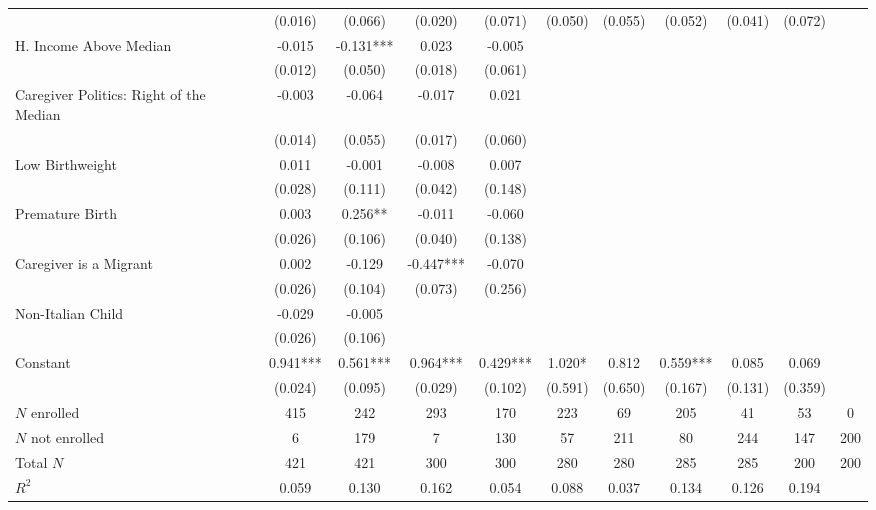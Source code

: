 \begin{tabular}{lcccccccccc}
 & (0.016) & (0.066) & (0.020) & (0.071) & (0.050) & (0.055) & (0.052) & (0.041) & (0.072) &  \\
H. Income Above Median & -0.015 & -0.131*** & 0.023 & -0.005 &  &  &  &  &  &  \\
 & (0.012) & (0.050) & (0.018) & (0.061) &  &  &  &  &  &  \\
Caregiver Politics: Right of the Median & -0.003 & -0.064 & -0.017 & 0.021 &  &  &  &  &  &  \\
 & (0.014) & (0.055) & (0.017) & (0.060) &  &  &  &  &  &  \\
Low Birthweight & 0.011 & -0.001 & -0.008 & 0.007 &  &  &  &  &  &  \\
 & (0.028) & (0.111) & (0.042) & (0.148) &  &  &  &  &  &  \\
Premature Birth & 0.003 & 0.256** & -0.011 & -0.060 &  &  &  &  &  &  \\
 & (0.026) & (0.106) & (0.040) & (0.138) &  &  &  &  &  &  \\
Caregiver is a Migrant & 0.002 & -0.129 & -0.447*** & -0.070 &  &  &  &  &  &  \\
 & (0.026) & (0.104) & (0.073) & (0.256) &  &  &  &  &  &  \\
Non-Italian Child & -0.029 & -0.005 &  &  &  &  &  &  &  &  \\
 & (0.026) & (0.106) &  &  &  &  &  &  &  &  \\
Constant & 0.941*** & 0.561*** & 0.964*** & 0.429*** & 1.020* & 0.812 & 0.559*** & 0.085 & 0.069 &  \\
 & (0.024) & (0.095) & (0.029) & (0.102) & (0.591) & (0.650) & (0.167) & (0.131) & (0.359) &  \\
\midrule
$N$ enrolled & 415 & 242 & 293 & 170 & 223 & 69 & 205 & 41 & 53 & 0 \\
$N$ not enrolled & 6 & 179 & 7 & 130 & 57 & 211 & 80 & 244 & 147 & 200 \\
Total $N$ & 421 & 421 & 300 & 300 & 280 & 280 & 285 & 285 & 200 & 200 \\$R^2$ & 0.059 & 0.130 & 0.162 & 0.054 & 0.088 & 0.037 & 0.134 & 0.126 & 0.194 &  \\ \bottomrule
\end{tabular}
